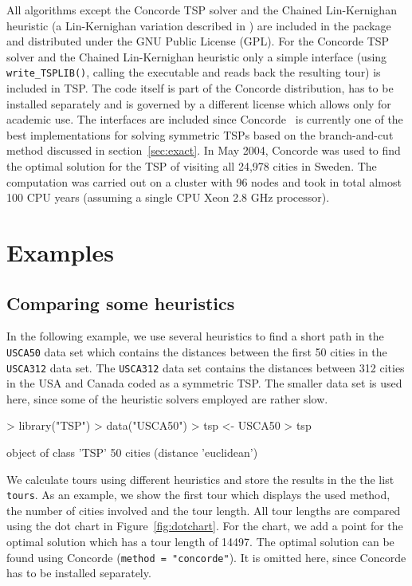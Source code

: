 \documentclass[10pt,a4paper,fleqn]{article}
\newcommand{\strong}[1]{{\normalfont\fontseries{b}\selectfont #1}}
\newcommand{\func}[1]{\mbox{\texttt{#1()}}}
\newcommand{\code}[1]{\mbox{\texttt{#1}}}
\newcommand{\pkg}[1]{\strong{#1}}
\begin{document}
All algorithms except the Concorde TSP solver and the Chained
Lin-Kernighan heuristic (a Lin-Kernighan variation described in
\cite{Applegate2003}) are included in the package and distributed under
the GNU Public License (GPL). For the Concorde TSP solver and the
Chained Lin-Kernighan heuristic only a simple interface (using
\func{write\_TSPLIB}, calling the executable and reads back the
resulting tour) is included in \pkg{TSP}.  The code itself is part of
the Concorde distribution, has to be installed separately and is
governed by a different license which allows only for academic use.  The
interfaces are included since
Concorde~\citep{Applegate2000,Applegate2006} is currently one of the
best implementations for solving symmetric TSPs based on the
branch-and-cut method discussed in section~\ref{sec:exact}.  In May
2004, Concorde was used to find the optimal solution for the TSP of
visiting all 24,978 cities in Sweden.  The computation was carried out
on a cluster with 96 nodes and took in total almost 100 CPU years
(assuming a single CPU Xeon 2.8 GHz processor).

\section{Examples}\label{sec:examples}

\subsection{Comparing some heuristics}

In the following example, we use several heuristics to find a short path
in the \code{USCA50} data set which contains the distances between the
first 50 cities in the \code{USCA312} data set. The \code{USCA312} data
set contains the distances between 312 cities in the USA and Canada
coded as a symmetric TSP.  The smaller data set is used here, since some
of the heuristic solvers employed are rather slow.

\begin{Schunk}
\begin{Sinput}
> library("TSP")
> data("USCA50")
> tsp <- USCA50
> tsp
\end{Sinput}
\begin{Soutput}
object of class 'TSP' 
50 cities (distance 'euclidean') 
\end{Soutput}
\end{Schunk}


We calculate tours using different heuristics and store the results in the the
list \code{tours}. As an example, we show the first tour which displays the
used method, the number of cities involved and the tour length.  All tour
lengths are compared using the dot chart in Figure~\ref{fig:dotchart}.  For the
chart, we add a point for the optimal solution which has a tour length of
14497. The optimal solution can be found using Concorde (\code{method =
"concorde"}).  It is omitted here, since Concorde has to be installed
separately.
\end{document}
